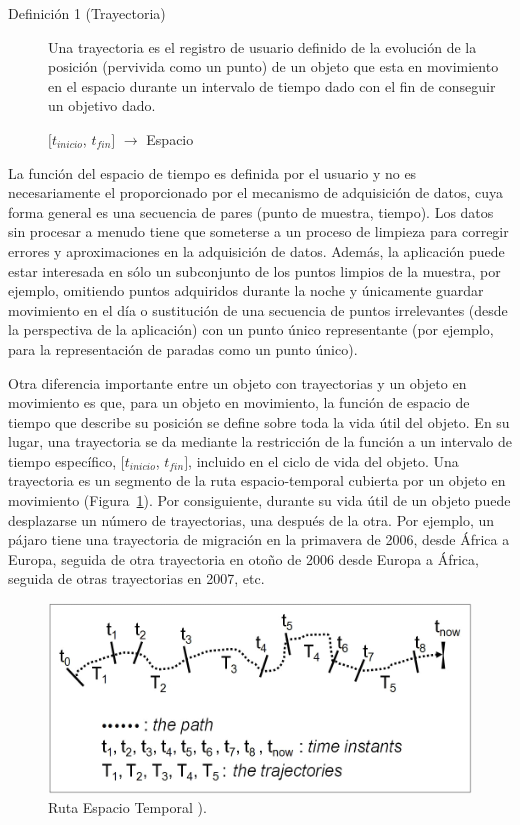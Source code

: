\begin{description}
 \item [Definición 1 (Trayectoria)] Una trayectoria es el registro de usuario definido de la evolución de la posición
(pervivida como un punto) de un objeto que esta en movimiento en el espacio  durante un intervalo de tiempo dado con el fin de conseguir 
un objetivo dado.
  
  \begin{center}
  $[t_{inicio}$, $t_{fin}]$ $ \rightarrow $ Espacio
  \end{center}

\end{description}

La función del espacio de tiempo es definida por
el usuario y no es necesariamente el proporcionado por el mecanismo de adquisición de datos, cuya forma general es 
una secuencia de pares (punto de muestra, tiempo). Los datos sin procesar
a menudo tiene que someterse a un proceso de limpieza para corregir errores y aproximaciones en la adquisición de datos.
Además, la aplicación puede estar interesada en sólo un subconjunto de los puntos limpios de la muestra, por ejemplo,
omitiendo puntos adquiridos durante la noche y únicamente guardar movimiento en el día o sustitución de una secuencia
de puntos irrelevantes (desde la perspectiva de la aplicación) con un punto único representante 
(por ejemplo, para la representación de paradas como un punto único).

Otra diferencia importante entre un objeto con trayectorias y un objeto en movimiento  es que, para un 
objeto en movimiento, la función de espacio de tiempo 
que describe su posición se define sobre toda la vida útil del objeto. En su lugar, una trayectoria se da mediante
la restricción de la función a un intervalo de tiempo específico, $[t_{inicio}$,  $t_{fin}]$, 
incluido en el ciclo de vida del
objeto. Una trayectoria es un segmento de la ruta espacio-temporal cubierta por un objeto en movimiento 
(Figura~\ref{fig:ruta}). Por consiguiente, durante su vida útil de un objeto puede desplazarse un número de trayectorias,
una después de la otra. Por ejemplo, un pájaro tiene una trayectoria de migración en la primavera de 2006, desde
África a Europa, seguida de otra trayectoria en otoño de 2006 desde Europa a África, seguida de otras trayectorias 
en 2007, etc.

\begin{figure}
  \centering
  \includegraphics[scale=0.4]{pictures/trayectoria.png}
  \caption{Ruta Espacio Temporal \cite{spaccapietra2008conceptual}).}
  \label{fig:ruta}
\end{figure}

